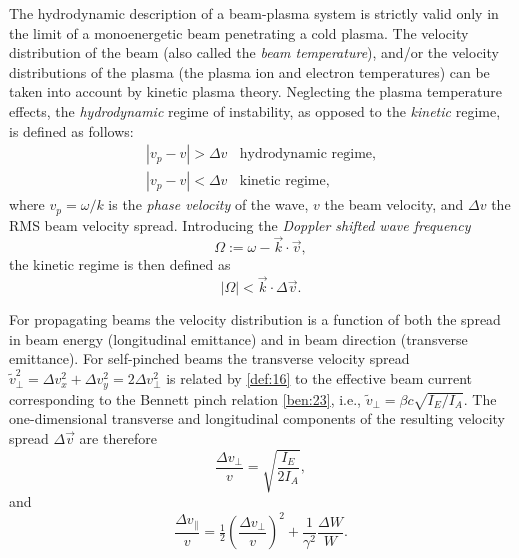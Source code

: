 \documentclass [12pt,a4paper,     ]{report} %
\newcommand{\DEF}{:=}                 %
\newcommand{\Oh}{\tfrac{1}{2}}        %
\begin{document}
	The hydrodynamic description of a beam-plasma system is strictly valid only in the limit of a monoenergetic beam penetrating a cold plasma.  The velocity distribution of the beam (also called the \emph{beam temperature}), and/or the velocity distributions of the plasma (the plasma ion and electron temperatures) can be taken into account by kinetic plasma theory.  Neglecting the plasma temperature effects, the \emph{hydrodynamic} regime of instability, as opposed to the \emph{kinetic} regime, is defined as follows:
%
\begin{equation}\label{sta:12} %
\begin{array}{l}
|v_p - v|  >  \Delta v  ~~~~ \text{hydrodynamic regime,} \\
|v_p - v|  <  \Delta v  ~~~~ \text{kinetic regime,~~~~~}
\end{array}
\end{equation}
%
where $v_p = \omega/k$ is the \emph{phase velocity} of the wave, $v$ the beam velocity, and $\Delta v$ the RMS beam velocity spread.  Introducing the \emph{Doppler shifted wave frequency}
%
\begin{equation}\label{sta:13} %
     \Omega \DEF  \omega - \vec{k} \cdot \vec{v},
\end{equation}
%
the kinetic regime is then defined as
%
\begin{equation}\label{sta:14} %
            |\Omega| < \vec{k} \cdot \Delta\vec{v}.
\end{equation}
%

	For propagating beams the velocity distribution is a function of both the spread in beam energy (longitudinal emittance) and in beam direction (transverse emittance).  For self-pinched beams the transverse velocity spread $\tilde{v}_{\perp}^2 = \Delta v_x^2 + \Delta v_y^2 = 2 \Delta v_{\perp}^2$ is related by \eqref{def:16} to the effective beam current corresponding to the Bennett pinch relation \eqref{ben:23}, i.e.,  $\tilde{v}_{\perp} = \beta c\sqrt{I_E/I_A}$.
The one-dimensional transverse and longitudinal components of the resulting velocity spread $\Delta\vec{v}$ are therefore \cite{LEE--1977B, NEWBE1982-}
%
\begin{equation}\label{sta:15} %
   \frac{\Delta v_{\perp}}{v} = \sqrt{\frac{I_E}{2I_A} },
\end{equation}
%
and \cite{BENFO1973-, THODE1976-}
%
\begin{equation}\label{sta:16} %
     \frac{\Delta v_{\|}}{v} = \Oh (\frac{\Delta v_{\perp}}{v})^2
                            + \frac{1}{\gamma^2} \frac{\Delta W}{W}.
\end{equation}
%
\end{document}
